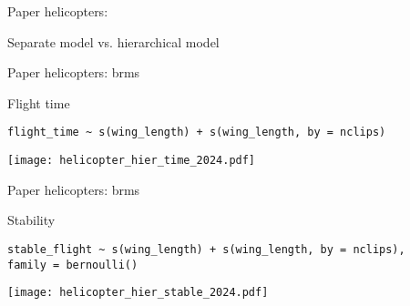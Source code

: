 \documentclass[finnish,english,t]{beamer}
\begin{document}
  


  

\begin{frame}[fragile]{Paper helicopters: }

  \vspace{-0.5\baselineskip}
  Separate model vs. hierarchical model
  \vspace{-0.25\baselineskip}
  
  
\end{frame}

\begin{frame}[fragile]{Paper helicopters: brms}

  Flight time

{\small
\begin{verbatim}
flight_time ~ s(wing_length) + s(wing_length, by = nclips)
\end{verbatim}
}

  \texttt{[image: helicopter\_hier\_time\_2024.pdf]}

\end{frame}

\begin{frame}[fragile]{Paper helicopters: brms}

Stability
  
{\small
\begin{verbatim}
stable_flight ~ s(wing_length) + s(wing_length, by = nclips),
family = bernoulli()
\end{verbatim}
}

  \texttt{[image: helicopter\_hier\_stable\_2024.pdf]}

\end{frame}
\end{document}
